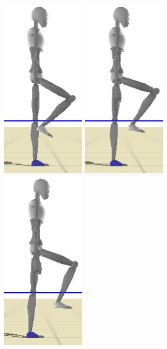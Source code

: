 \documentclass[conference]{acmsiggraph}
\begin{document}
\begin{figure}[t]
\includegraphics[scale=0.17]{images/strips/0_5/4.png}
\includegraphics[scale=0.17]{images/strips/0_5/5.png}
\includegraphics[scale=0.17]{images/strips/0_5/6.png}

\end{figure}
\end{document}
